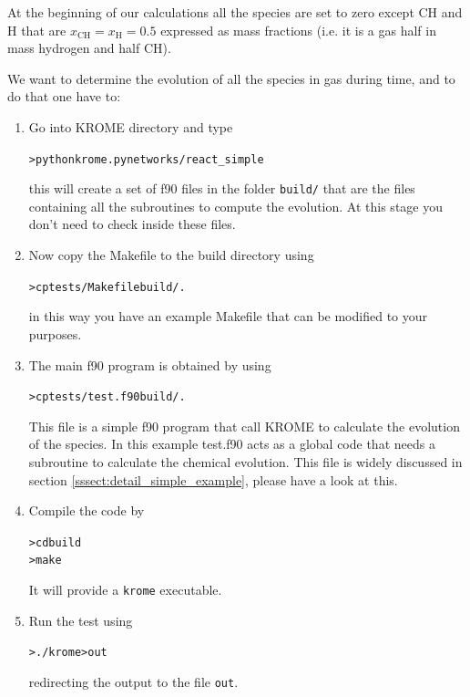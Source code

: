 \documentclass[10pt]{article}
\begin{document}
At the beginning of our calculations all the species are set to zero except CH and H that are $x_\mathrm{CH}=x_\mathrm{H}=0.5$ expressed as mass fractions (i.e. it is a gas half in mass hydrogen and half CH).

We want to determine the evolution of all the species in gas during time, and to do that one have to:
\begin{enumerate}
	\item Go into KROME directory and type
	\begin{alltt}
		> python krome.py networks/react_simple
	\end{alltt}
	this will create a set of f90 files in the folder \verb|build/| that are the files containing all the subroutines to compute the evolution. At this stage you don't need to check inside these files.

	\item Now copy the Makefile to the build directory using
	\begin{alltt}
		> cp tests/Makefile build/.
	\end{alltt}
	in this way you have an example Makefile that can be modified to your purposes.

	\item The main f90 program is obtained by using
	\begin{alltt}
		> cp tests/test.f90 build/.
	\end{alltt}
	This file is a simple f90 program that call KROME to calculate the evolution of the species. In this example test.f90 acts as a global code that needs a subroutine to calculate the chemical evolution. This file is widely discussed in section 
\ref{sssect:detail_simple_example}, please have a look at this.

	\item Compile the code by 
	\begin{alltt}
		> cd build
		> make
	\end{alltt}
	It will provide a \verb|krome| executable.

	\item Run the test using 
	\begin{alltt}
		> ./krome > out
	\end{alltt}
	redirecting the output to the file \verb|out|.
	

\end{enumerate}
\end{document}
